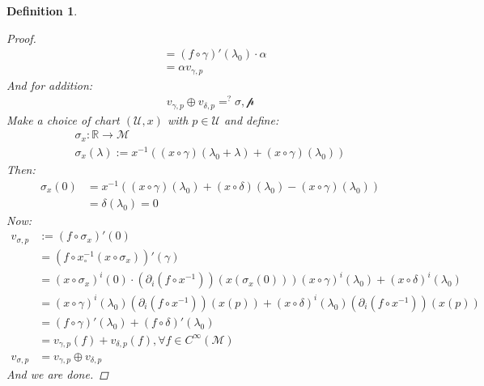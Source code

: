 \documentclass[10pt, oneside]{article}
\newcommand{\R}{\mathbb{R}}
\newcommand{\M}{\mathcal{M}}
\newtheorem{defn}{Definition}
\begin{document}
\begin{defn}
\begin{proof}
\begin{align*}
              &= (f \circ \gamma)' (\lambda_0) \cdot \alpha \\
              &= \alpha v_{\gamma,p}
           \end{align*}
           And for addition:
           \begin{align*}
              v_{\gamma,p} \oplus v_{\delta,p} =^? \mathcal{\sigma,p}
           \end{align*}
           Make a choice of chart $(\mathcal{U},x)$ with $p \in \mathcal{U}$ and define:
           \begin{align*}
              \sigma_x: \R \to \M \\
              \sigma_x(\lambda) := x^{-1} ((x \circ \gamma)(\lambda_0 + \lambda)+ (x \circ \gamma)(\lambda_0))
           \end{align*}
           Then:
           \begin{align*}
              \sigma_x (0) &= x^{-1} ((x \circ \gamma)(\lambda_0)+(x \circ \delta)(\lambda_0)-(x \circ \gamma)(\lambda_0)) \\
              &= \delta(\lambda_0) = 0  
           \end{align*}
           Now:
           \begin{align*}
              v_{\sigma ,p} &:= (f \circ \sigma_x)' (0) \\
              &= (f \circ x^{-1}_\circ(x \circ \sigma_x))'(\gamma) \\
              &= (x \circ \sigma_x)^i(0) \cdot (\partial_i (f \circ x^{-1}))(x(\sigma_x(0))) (x \circ \gamma)^i (\lambda_0) + (x \circ \delta)^i (\lambda_0)\\
              &= (x \circ \gamma)^i(\lambda_0)(\partial_i(f \circ x^{-1}))(x(p)) + (x \circ \delta)^i(\lambda_0)(\partial_i(f \circ x^{-1}))(x(p)) \\
              &= (f \circ \gamma)'(\lambda_0) + (f \circ \delta)' (\lambda_0) \\
              &= v_{\gamma,p}(f) + v_{\delta,p}(f), \forall f \in C^\infty (\M) \\
              v_{\sigma,p} &= v_{\gamma,p} \oplus v_{\delta,p}
           \end{align*}
           And we are done.
        \end{proof}
     \end{defn}
\end{document}
